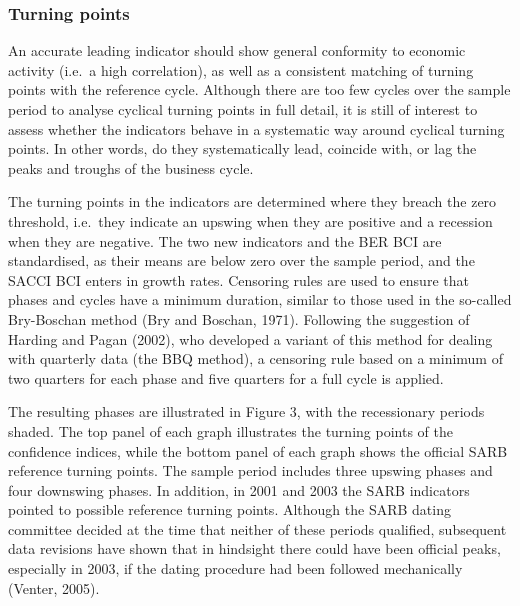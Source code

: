 \documentclass[11pt,]{article}
\begin{document}
\begin{table}[ht]
\centering
\caption{Correlations between confidence indicators and real GDP growth} 
\end{table}

\subsubsection{Turning points}\label{turning-points}

An accurate leading indicator should show general conformity to economic
activity (i.e.~a high correlation), as well as a consistent matching of
turning points with the reference cycle. Although there are too few
cycles over the sample period to analyse cyclical turning points in full
detail, it is still of interest to assess whether the indicators behave
in a systematic way around cyclical turning points. In other words, do
they systematically lead, coincide with, or lag the peaks and troughs of
the business cycle.

The turning points in the indicators are determined where they breach
the zero threshold, i.e.~they indicate an upswing when they are positive
and a recession when they are negative. The two new indicators and the
BER BCI are standardised, as their means are below zero over the sample
period, and the SACCI BCI enters in growth rates. Censoring rules are
used to ensure that phases and cycles have a minimum duration, similar
to those used in the so-called Bry-Boschan method (Bry and Boschan,
1971). Following the suggestion of Harding and Pagan (2002), who
developed a variant of this method for dealing with quarterly data (the
BBQ method), a censoring rule based on a minimum of two quarters for
each phase and five quarters for a full cycle is applied.

The resulting phases are illustrated in Figure 3, with the recessionary
periods shaded. The top panel of each graph illustrates the turning
points of the confidence indices, while the bottom panel of each graph
shows the official SARB reference turning points. The sample period
includes three upswing phases and four downswing phases. In addition, in
2001 and 2003 the SARB indicators pointed to possible reference turning
points. Although the SARB dating committee decided at the time that
neither of these periods qualified, subsequent data revisions have shown
that in hindsight there could have been official peaks, especially in
2003, if the dating procedure had been followed mechanically (Venter,
2005).
\end{document}
